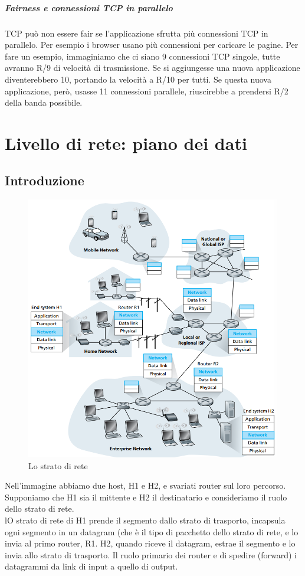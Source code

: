 \documentclass[11pt,a4paper]{book}
\begin{document}
\paragraph{Fairness e connessioni TCP in parallelo}
TCP può non essere fair se l'applicazione sfrutta più connessioni TCP in parallelo. Per esempio i browser usano più connessioni per caricare le pagine. Per fare un esempio, immaginiamo che ci siano 9 connessioni TCP singole, tutte avranno R/9 di velocità di trasmissione. Se si aggiungesse una nuova applicazione diventerebbero 10, portando la velocità a R/10 per tutti. Se questa nuova applicazione, però, usasse 11 connessioni parallele, riuscirebbe a prendersi R/2 della banda possibile.

\chapter{Livello di rete: piano dei dati}
\section{Introduzione}
\begin{figure}
	\includegraphics[scale=0.6]{img/049.png}
	\caption{Lo strato di rete}
\end{figure}
Nell'immagine abbiamo due host, H1 e H2, e svariati router sul loro percorso. Supponiamo che H1 sia il mittente e H2 il destinatario e consideriamo il ruolo dello strato di rete. \\
lO strato di rete di H1 prende il segmento dallo strato di trasporto, incapsula ogni segmento in un datagram (che è il tipo di pacchetto dello strato di rete, e lo invia al primo router, R1. H2, quando riceve il datagram, estrae il segmento e lo invia allo strato di trasporto. Il ruolo primario dei router e di spedire (forward) i datagrammi da link di input a quello di output.
\end{document}
